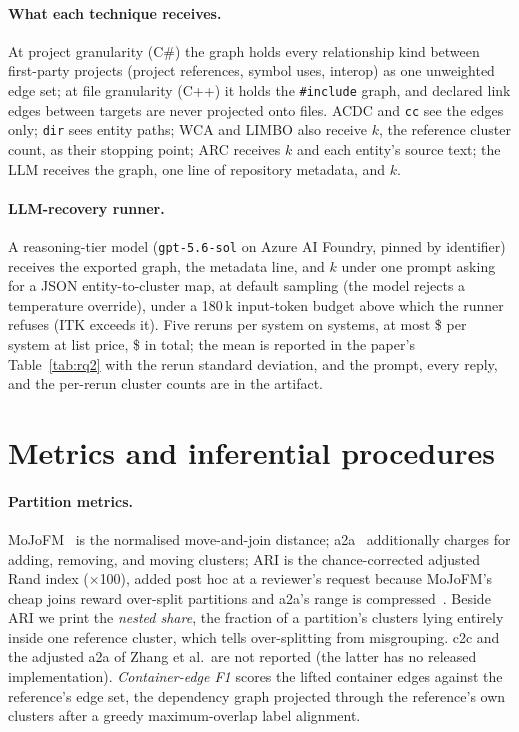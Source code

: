 \documentclass[10pt,conference]{IEEEtran}
\begin{document}
\paragraph{What each technique receives.} At project granularity (C\#) the graph holds every
relationship kind between first-party projects (project references, symbol uses, interop) as one
unweighted edge set; at file granularity (C++) it holds the \texttt{\#include} graph, and declared
link edges between targets are never projected onto files. ACDC and \texttt{cc} see the edges
only; \texttt{dir} sees entity paths; WCA and LIMBO also receive $k$, the reference cluster count,
as their stopping point; ARC receives $k$ and each entity's source text; the LLM receives the
graph, one line of repository metadata, and $k$.

\paragraph{LLM-recovery runner.} A reasoning-tier model (\texttt{gpt-5.6-sol} on Azure AI
Foundry, pinned by identifier) receives the exported graph, the metadata line, and $k$ under one
prompt asking for a JSON entity-to-cluster map, at default sampling (the model rejects a
temperature override), under a 180\,k input-token budget above which the runner refuses (ITK
exceeds it). Five reruns per system on \rqTwoLlmSystemsRan{} systems, at most
\$\rqTwoLlmCostMaxUsd{} per system at list price, \$\rqTwoLlmCostTotalUsd{} in total; the mean is
reported in the paper's Table~\ref{tab:rq2} with the rerun standard deviation, and the prompt,
every reply, and the per-rerun cluster counts are in the artifact.

\section{Metrics and inferential procedures}
\label{sec:tr-stats}

\paragraph{Partition metrics.} MoJoFM~\cite{mojofm} is the normalised move-and-join distance;
a2a~\cite{le2015a2a} additionally charges for adding, removing, and moving clusters; ARI is the
chance-corrected adjusted Rand index ($\times$100), added post hoc at a reviewer's request because
MoJoFM's cheap joins reward over-split partitions and a2a's range is
compressed~\cite{zhang2023sarif}. Beside ARI we print the \emph{nested share}, the fraction of a
partition's clusters lying entirely inside one reference cluster, which tells over-splitting from
misgrouping. c2c and the adjusted a2a of Zhang et al.\ are not reported (the latter has no released
implementation). \emph{Container-edge F1} scores the lifted container edges against the reference's
edge set, the dependency graph projected through the reference's own clusters after a greedy
maximum-overlap label alignment.
\end{document}
